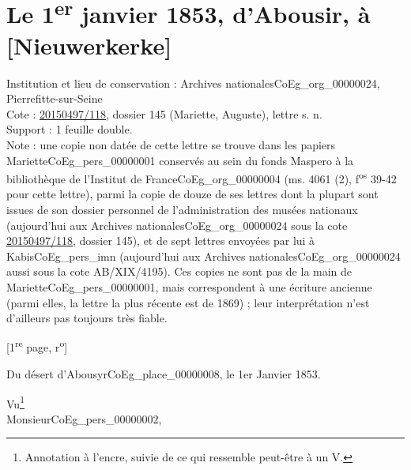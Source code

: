 \documentclass{book}
\begin{document}
\section*{Le 1\textsuperscript{er} janvier 1853, d'Abousir, à [Nieuwerkerke]} \label{CoEg_Mariette_1853-01-01} 
{\footnotesize
\noindent Institution et lieu de conservation : Archives nationales\gls{CoEg_org_00000024}, Pierrefitte-sur-Seine\\
Cote : \hyperref[CoEg_Mariette_ms_001]{20150497/118}, dossier 145 (Mariette, Auguste), lettre s. n.\\
Support : 1 feuille double.\\
Note : une copie non datée de cette lettre se trouve dans les papiers Mariette\gls{CoEg_pers_00000001} conservés au sein du fonds Maspero à la bibliothèque de l'Institut de France\gls{CoEg_org_00000004} (ms. 4061 (2), f\textsuperscript{os} 39-42 pour cette lettre), parmi la copie de douze de ses lettres dont la plupart sont issues de son dossier personnel de l'administration des musées nationaux (aujourd'hui aux Archives nationales\gls{CoEg_org_00000024} sous la cote \hyperref[CoEg_Mariette_ms_001]{20150497/118}, dossier 145), et de sept lettres envoyées par lui à Kabis\gls{CoEg_pers_imn} (aujourd'hui aux Archives nationales\gls{CoEg_org_00000024} aussi sous la cote AB/XIX/4195). Ces copies ne sont pas de la main de Mariette\gls{CoEg_pers_00000001}, mais correspondent à une écriture ancienne (parmi elles, la lettre la plus récente est de 1869) ; leur interprétation n'est d'ailleurs pas toujours très fiable.
\begin{center} {[1\textsuperscript{re} page, r\textsuperscript{o}]}\end{center}}
\begin{flushright}Du désert d’Abousyr\gls{CoEg_place_00000008}, le 1er  Janvier 1853.\end{flushright}
\indent Vu\footnote{Annotation à l'encre, suivie de ce qui ressemble peut-être à un V.}\\

\hspace{1cm} Monsieur\gls{CoEg_pers_00000002},\\
\end{document}
